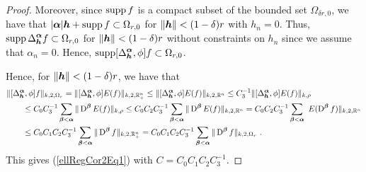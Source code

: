 \begin{proof}
Moreover, since $\operatorname{supp} f$ is a compact subset of the bounded set
$\Omega_{\delta r,0}$, we have that
$|{\bm{\alpha}}| {\bm{h}} + \operatorname{supp} f \subset \Omega_{r,0}$
for $\|{\bm{h}}\| < (1-\delta)r$ with $h_n = 0$.    Thus,
$\displaystyle \operatorname{supp} \Delta^{{\bm{\alpha}}}_{{\bm{h}}} f \subset \Omega_{r,0}$ for
$\|{\bm{h}}\| < (1-\delta)r$ without constraints on $h_n$ since we assume
that $\alpha_n = 0$.  Hence,
$\displaystyle \operatorname{supp} [\Delta^{{\bm{\alpha}}}_{{\bm{h}}}, \phi] f
\subset \Omega_{r,0}$.

Hence, for $\|{\bm{h}}\| < (1-\delta)r$, we have that
\begin{align*}
&\| [\Delta^{{\bm{\alpha}}}_{{\bm{h}}}, \phi] f \|_{k,2,\Omega_r}
= \| [\Delta^{{\bm{\alpha}}}_{{\bm{h}}}, \phi] E(f) \|_{k,2,\mathbb{R}^n_+}
\leq \| [\Delta^{{\bm{\alpha}}}_{{\bm{h}}}, \phi] E(f) \|_{k,2,\mathbb{R}^n}
\leq C_3^{-1} \| [\Delta^{{\bm{\alpha}}}_{{\bm{h}}}, \phi] E(f) \|_{k,\rho} \\
&\qquad \leq C_0 C_3^{-1} \sum_{{\bm{\beta}}<{\bm{\alpha}}}
\| \operatorname{D}^{{\bm{\beta}}} E(f) \|_{k,\rho}
\leq C_0 C_2 C_3^{-1} \sum_{{\bm{\beta}}<{\bm{\alpha}}} \|
\operatorname{D}^{{\bm{\beta}}} E(f)  \|_{k,2,\mathbb{R}^n}
= C_0 C_2 C_3^{-1} \sum_{{\bm{\beta}}<{\bm{\alpha}}} \
E(\operatorname{D}^{{\bm{\beta}}} f) \|_{k,2,\mathbb{R}^n}\\
&\qquad \leq C_0 C_1 C_2 C_3^{-1}
\sum_{{\bm{\beta}}<{\bm{\alpha}}} \| \operatorname{D}^{{\bm{\beta}}} f \|_{k,2,\mathbb{R}^n_+}
=  C_0 C_1 C_2 C_3^{-1} \sum_{{\bm{\beta}}<{\bm{\alpha}}}
\| \operatorname{D}^{{\bm{\beta}}} f \|_{k,2,\Omega_r} \ .
\end{align*}
This gives (\ref{ellRegCor2Eq1}) with $C = C_0 C_1 C_2 C_3^{-1}$.
\end{proof}

